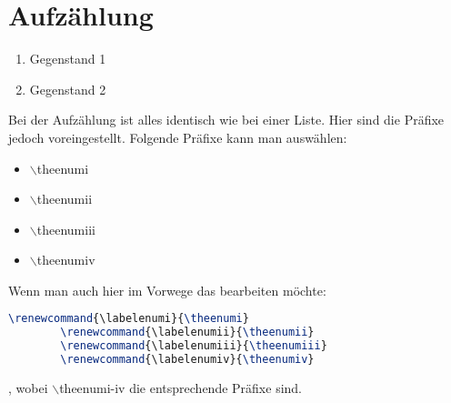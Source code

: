 \documentclass{scrarticle}
\begin{document}
	\section{Aufzählung}
	\begin{enumerate}
		\item Gegenstand 1
		\item Gegenstand 2
	\end{enumerate}
	Bei der Aufzählung ist alles identisch wie bei einer Liste. Hier sind die Präfixe jedoch voreingestellt. Folgende Präfixe kann man auswählen:
	\begin{itemize}
		\item[] $\backslash$theenumi
		\item[] $\backslash$theenumii
		\item[] $\backslash$theenumiii
		\item[] $\backslash$theenumiv
	\end{itemize}
	Wenn man auch hier im Vorwege das bearbeiten möchte:
	\begin{lstlisting}[language=TeX]
		\renewcommand{\labelenumi}{\theenumi}
		\renewcommand{\labelenumii}{\theenumii}
		\renewcommand{\labelenumiii}{\theenumiii}
		\renewcommand{\labelenumiv}{\theenumiv}
	\end{lstlisting}
	, wobei $\backslash$theenumi-iv die entsprechende Präfixe sind.
\end{document}
